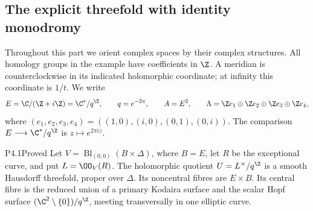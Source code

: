 \subsection{The explicit threefold with identity monodromy}

Throughout this part we orient complex spaces by their complex structures.
All homology groups in the example have coefficients in $\Z$. A meridian is
counterclockwise in its indicated holomorphic coordinate; at infinity this
coordinate is $1/t$. We write
\[
 E=\C/(\Z+i\Z)=\C^*/q^\Z,\qquad q=e^{-2\pi},\qquad
 A=E^2,\qquad \Lambda=\Z e_1\oplus\Z e_2\oplus\Z e_3\oplus\Z e_4,
\]
where $(e_1,e_2,e_3,e_4)=((1,0),(i,0),(0,1),(0,i))$. The comparison
$E\longrightarrow\C^*/q^\Z$ is $z\mapsto e^{2\pi iz}$.

\begin{statement}{P4.1}{Proved}
Let $V=\operatorname{Bl}_{(0,0)}(B\times\Delta)$, where $B=E$, let $R$ be
the exceptional curve, and put $L=\OO_V(R)$. The holomorphic quotient
$U=L^\times/q^\Z$ is a smooth Hausdorff threefold, proper over $\Delta$.
Its noncentral fibres are $E\times B$. Its central fibre is the reduced
union of a primary Kodaira surface and the scalar Hopf surface
$(\C^2\setminus\{0\})/q^\Z$, meeting transversally in one elliptic curve.
\end{statement}
